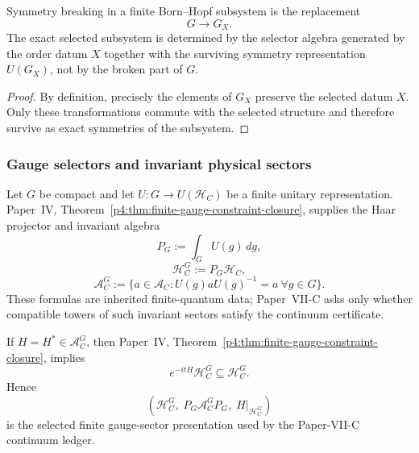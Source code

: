 \documentclass[12pt,a4paper]{article}
\begin{document}
\begin{proposition}
\label{p12:prop:symmetry-breaking-selector-reduction}
Symmetry breaking in a finite Born--Hopf subsystem is the replacement
\[
G\longrightarrow G_X.
\]
The exact selected subsystem is determined by the selector algebra generated by the order datum \(X\) together with the surviving symmetry representation \(U(G_X)\), not by the broken part of \(G\).
\end{proposition}

\begin{proof}
By definition, precisely the elements of \(G_X\) preserve the selected datum \(X\).  Only these transformations commute with the selected structure and therefore survive as exact symmetries of the subsystem.
\end{proof}


\subsubsection{Gauge selectors and invariant physical sectors}

\begin{definition}
\label{p12:def:finite-gauge-selector}
Let \(G\) be compact and let \(U:G\to U(\mathcal H_C)\) be a finite unitary
representation.  Paper~IV, Theorem~\ref{p4:thm:finite-gauge-constraint-closure}, supplies the Haar projector and invariant algebra
\begin{equation}
\label{p12:eq:gauge-haar-projection}
P_G:=\int_G U(g)\,dg,
\end{equation}
\begin{equation}
\label{p12:eq:gauge-physical-carrier}
\mathcal H_C^G:=P_G\mathcal H_C,
\end{equation}
\begin{equation}
\label{p12:eq:gauge-invariant-observables}
\mathcal A_C^G:=\{a\in\mathcal A_C:U(g)aU(g)^{-1}=a\ \forall g\in G\}.
\end{equation}
These formulas are inherited finite-quantum data; Paper~VII-C asks only whether
compatible towers of such invariant sectors satisfy the continuum certificate.
\end{definition}

\begin{proposition}
\label{p12:thm:finite-gauge-projection}
If \(H=H^\ast\in\mathcal A_C^G\), then Paper~IV, Theorem~\ref{p4:thm:finite-gauge-constraint-closure},
implies
\[
e^{-itH}\mathcal H_C^G\subseteq\mathcal H_C^G.
\]
Hence
\[
(\mathcal H_C^G,\;P_G\mathcal A_C^GP_G,\;H|_{\mathcal H_C^G})
\]
is the selected finite gauge-sector presentation used by the Paper-VII-C
continuum ledger.
\end{proposition}
\end{document}
